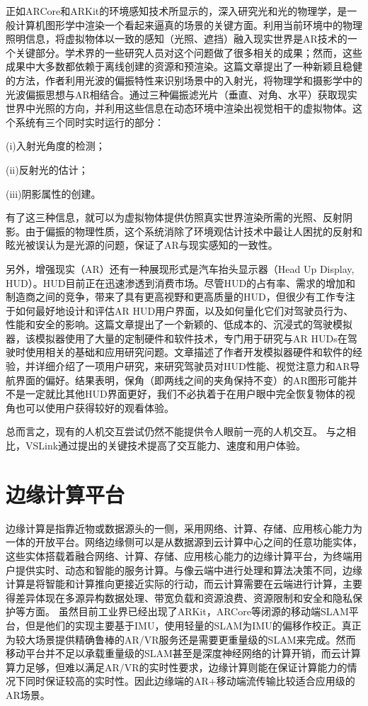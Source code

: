 正如ARCore和ARKit的环境感知技术所显示的，深入研究光和光的物理学，是一般计算机图形学中渲染一个看起来逼真的场景的关键方面。利用当前环境中的物理照明信息，将虚拟物体以一致的感知（光照、遮挡）融入现实世界是AR技术的一个关键部分。学术界的一些研究人员对这个问题做了很多相关的成果；然而，这些成果中大多数都依赖于离线创建的资源和预渲染。这篇文章\cite{AlhTuc19}提出了一种新颖且稳健的方法，作者利用光波的偏振特性来识别场景中的入射光，将物理学和摄影学中的光波偏振思想与AR相结合。通过三种偏振滤光片（垂直、对角、水平）获取现实世界中光照的方向，并利用这些信息在动态环境中渲染出视觉相干的虚拟物体。这个系统有三个同时实时运行的部分：

(i)入射光角度的检测；

(ii)反射光的估计；

(iii)阴影属性的创建。

有了这三种信息，就可以为虚拟物体提供仿照真实世界渲染所需的光照、反射阴影。由于偏振的物理性质，这个系统消除了环境观估计技术中最让人困扰的反射和眩光被误认为是光源的问题，保证了AR与现实感知的一致性。

另外，增强现实（AR）还有一种展现形式是汽车抬头显示器（Head Up Display, HUD）。HUD目前正在迅速渗透到消费市场。尽管HUD的占有率、需求的增加和制造商之间的竞争，带来了具有更高视野和更高质量的HUD，但很少有工作专注于如何最好地设计和评估AR HUD用户界面，以及如何量化它们对驾驶员行为、性能和安全的影响。这篇文章\cite{GabSmiTan19}提出了一个新颖的、低成本的、沉浸式的驾驶模拟器，该模拟器使用了大量的定制硬件和软件技术，专门用于研究与AR HUDs在驾驶时使用相关的基础和应用研究问题。文章描述了作者开发模拟器硬件和软件的经验，并详细介绍了一项用户研究，来研究驾驶员对HUD性能、视觉注意力和AR导航界面的偏好。结果表明，保角（即两线之间的夹角保持不变）的AR图形可能并不是一定就比其他HUD界面更好，我们不必执着于在用户眼中完全恢复物体的视角也可以使用户获得较好的观看体验。


总而言之，现有的人机交互尝试仍然不能提供令人眼前一亮的人机交互。
与之相比，VSLink通过提出的关键技术提高了交互能力、速度和用户体验。

\section{边缘计算平台}
边缘计算是指靠近物或数据源头的一侧，采用网络、计算、存储、应用核心能力为一体的开放平台。网络边缘侧可以是从数据源到云计算中心之间的任意功能实体，这些实体搭载着融合网络、计算、存储、应用核心能力的边缘计算平台，为终端用户提供实时、动态和智能的服务计算。与像云端中进行处理和算法决策不同，边缘计算是将智能和计算推向更接近实际的行动，而云计算需要在云端进行计算，主要得差异体现在多源异构数据处理、带宽负载和资源浪费、资源限制和安全和隐私保护等方面。
虽然目前工业界已经出现了ARKit，ARCore等闭源的移动端SLAM平台，但是他们的实现主要基于IMU，使用轻量的SLAM为IMU的偏移作校正。真正为较大场景提供精确鲁棒的AR/VR服务还是需要更重量级的SLAM来完成。然而移动平台并不足以承载重量级的SLAM甚至是深度神经网络的计算开销，而云计算算力足够，但难以满足AR/VR的实时性要求，边缘计算则能在保证计算能力的情况下同时保证较高的实时性。因此边缘端的AR+移动端流传输比较适合应用级的AR场景。

